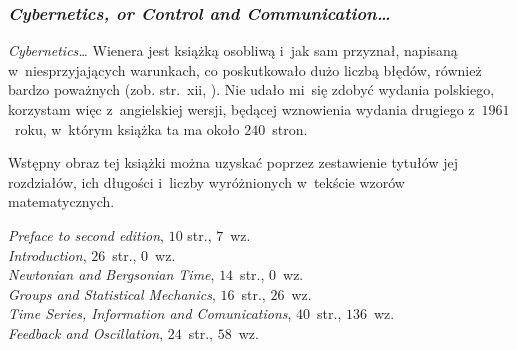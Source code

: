 \documentclass[10pt,t]{beamer}
\begin{document}





\begin{frame}
  \frametitle{\textit{Cybernetics, or Control and
      Communication\ldots}}


  \textit{Cybernetics\ldots} Wienera jest książką osobliwą i~jak sam przyznał,
  napisaną w~niesprzyjających warunkach, co poskutkowało dużo liczbą błędów,
  również bardzo poważnych (zob. str.~xii,
  \parencite{Wiener-Cybernetics-Second-edition-Pub-2016}). Nie udało mi~się
  zdobyć wydania polskiego, korzystam więc z~angielskiej wersji, będącej
  wznowienia wydania drugiego z~$1961$~roku, w~którym książka ta ma około
  $240$~stron.

  Wstępny obraz tej książki można uzyskać poprzez zestawienie tytułów jej
  rozdziałów, ich długości i~liczby wyróżnionych w~tekście wzorów
  matematycznych.

  \textit{Preface to second edition}, $10$ str., $7$~wz. \\
  \textit{Introduction}, $26$~str., $0$~wz. \\
  \textit{Newtonian and Bergsonian Time}, $14$~str., $0$~wz. \\
  \textit{Groups and Statistical Mechanics}, $16$~str., $26$~wz. \\
  \textit{Time Series, Information and Comunications}, $40$~str.,
  $136$~wz. \\
  \textit{Feedback and Oscillation}, $24$~str., $58$~wz. \\

\end{frame}
\end{document}
